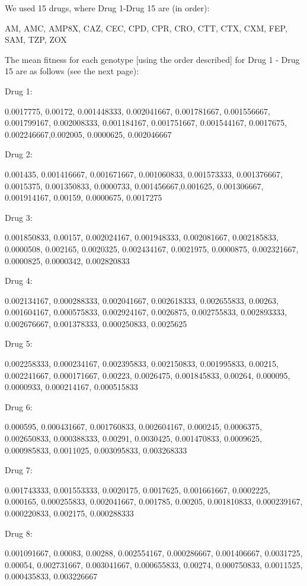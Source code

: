 \documentclass[12pt]{amsart}
\theoremstyle{plain}
\theoremstyle{definition}
\begin{document}
{We used 15 drugs,
where Drug 1-Drug 15 
are (in order):

AM,
AMC, 
AMP8X,
CAZ,
CEC,
CPD,
CPR,
CRO,
CTT,
CTX,
CXM,
FEP,
SAM, 
TZP,
ZOX

The mean fitness for each genotype [using the order described] for Drug 1 - Drug 15 
 are as follows (see the next page):





\newpage
Drug 1:

0.0017775, 0.00172, 0.001448333, 0.002041667,
0.001781667, 0.001556667, 0.001799167, 0.002008333, 0.001184167, 0.001751667, 0.001544167, 0.0017675, 0.002246667,0.002005, 0.0000625, 0.002046667



\bigskip
Drug 2:

0.001435, 0.001416667, 0.001671667, 0.001060833, 0.001573333, 0.001376667, 0.0015375, 0.001350833, 0.0000733, 0.001456667,0.001625, 0.001306667, 0.001914167, 0.00159, 0.0000675, 0.0017275

\bigskip
Drug 3:

0.001850833, 0.00157, 0.002024167, 0.001948333, 0.002081667, 0.002185833, 0.0000508, 0.002165, 0.0020325, 0.002434167, 0.0021975, 0.0000875, 0.002321667, 0.0000825, 0.0000342, 0.002820833
      
\bigskip
Drug 4:

0.002134167, 0.000288333, 0.002041667, 0.002618333, 0.002655833, 0.00263, 0.001604167, 0.000575833, 0.002924167, 0.0026875, 0.002755833, 0.002893333, 0.002676667, 0.001378333, 0.000250833, 0.0025625

\bigskip
Drug 5:

0.002258333, 0.000234167, 0.002395833, 0.002150833, 0.001995833, 0.00215, 0.002241667, 0.000171667, 0.00223, 0.0026475, 0.001845833, 0.00264, 0.000095, 0.0000933, 0.000214167, 0.000515833

\newpage
Drug 6:

0.000595, 0.000431667, 0.001760833, 0.002604167, 0.000245, 0.0006375, 0.002650833, 0.000388333, 0.00291, 0.0030425, 0.001470833, 0.0009625, 0.000985833, 0.0011025, 0.003095833, 0.003268333

\bigskip
Drug 7:

0.001743333, 0.001553333, 0.0020175, 0.0017625, 0.001661667, 0.0002225, 0.000165, 0.000255833, 0.002041667, 0.001785, 0.00205, 0.001810833, 0.000239167, 0.000220833, 0.002175, 0.000288333

\bigskip
Drug 8:

0.001091667, 0.00083, 0.00288, 0.002554167, 0.000286667, 0.001406667, 0.0031725, 0.00054, 0.002731667, 0.003041667, 0.000655833, 0.00274, 0.000750833, 0.0011525, 0.000435833, 0.003226667

}
\end{document}
